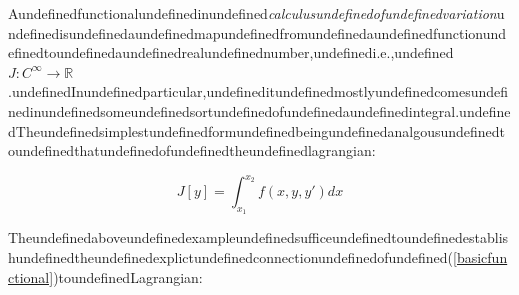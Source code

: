 Aundefinedfunctionalundefinedinundefined\textit{calculusundefinedofundefinedvariation}undefinedisundefinedaundefinedmapundefinedfromundefinedaundefinedfunctionundefinedtoundefinedaundefinedrealundefinednumber,undefinedi.e.,undefined$J:C^{\infty} \to \mathbb{R}$.undefinedInundefinedparticular,undefineditundefinedmostlyundefinedcomesundefinedinundefinedsomeundefinedsortundefinedofundefinedaundefinedintegral.undefinedTheundefinedsimplestundefinedformundefinedbeingundefinedanalgousundefinedtoundefinedthatundefinedofundefinedtheundefinedlagrangian:

\begin{equation}
\label{basicfunctional}
J[y] = \int_{x_1}^{x_2} f(x,y,y')dx
\end{equation}

Theundefinedaboveundefinedexampleundefinedsufficeundefinedtoundefinedestablishundefinedtheundefinedexplictundefinedconnectionundefinedofundefined(\ref{basicfunctional})toundefinedLagrangian:


